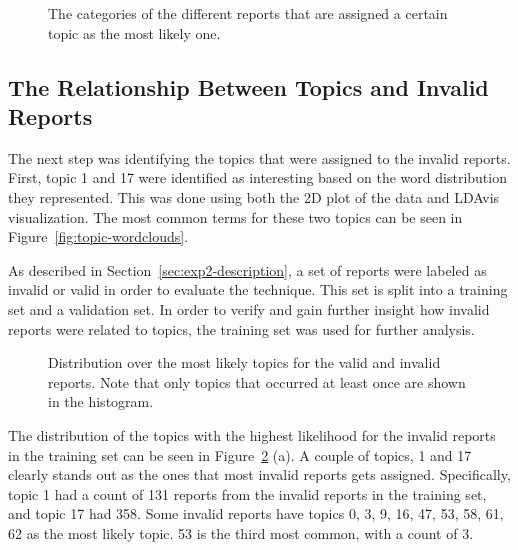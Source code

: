 \begin{figure}[h!]
    \centering
    \quad
    \caption{The categories of the different reports that are assigned a certain topic as the most likely one.}
    \label{fig:topic-category-distribution}
\end{figure}

\subsection{The Relationship Between Topics and Invalid Reports}

The next step was identifying the topics that were assigned to the invalid reports.
First, topic 1 and 17 were identified as interesting based on the word distribution they represented.
This was done using both the 2D plot of the data and LDAvis visualization.
The most common terms for these two topics can be seen in Figure~\ref{fig:topic-wordclouds}.

As described in Section~\ref{sec:exp2-description}, a set of reports were labeled as invalid or valid in order to evaluate the technique.
This set is split into a training set and a validation set.
In order to verify and gain further insight how invalid reports were related to topics, the training set was used for further analysis.

\begin{figure}[h!]
    \centering
    \caption{Distribution over the most likely topics for the valid and invalid reports. Note that only topics that occurred at least once are shown in the histogram.}
    \label{fig:most-likely-topics}
\end{figure}

The distribution of the topics with the highest likelihood for the invalid reports in the training set can be seen in Figure~\ref{fig:most-likely-topics} (a).
A couple of topics, 1 and 17 clearly stands out as the ones that most invalid reports gets assigned.
Specifically, topic 1 had a count of 131 reports from the invalid reports in the training set, and topic 17 had 358.
Some invalid reports have topics 0, 3, 9, 16, 47, 53, 58, 61, 62 as the most likely topic.
53 is the third most common, with a count of 3.


